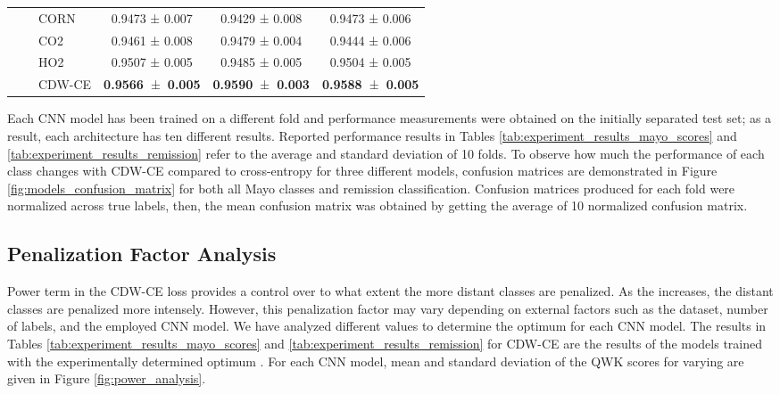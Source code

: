 \documentclass[runningheads]{llncs}
\begin{document}
\begin{table}[t!]
\begin{adjustbox}{center}
\begin{tabular}{cllccc}
                          &  & CORN                   & 0.9473 ± 0.007                   & 0.9429 ± 0.008                   & 0.9473 ± 0.006                    \\
                          &  & CO2                    & 0.9461 ± 0.008                   & 0.9479 ± 0.004                   & 0.9444 ± 0.006                    \\
                          &  & HO2                    & 0.9507 ± 0.005                   & 0.9485 ± 0.005                   & 0.9504 ± 0.005                    \\
                          &  & CDW-CE                 & \textbf{0.9566~}±\textbf{~0.005} & \textbf{0.9590~}±\textbf{~0.003} & \textbf{0.9588~}±\textbf{~0.005}  \\
\hline
\end{tabular}
\end{adjustbox}
\end{table}

Each CNN model has been trained on a different fold and performance measurements were obtained on the initially separated test set; as a result, each architecture has ten different results. Reported performance results in Tables \ref{tab:experiment_results_mayo_scores} and \ref{tab:experiment_results_remission} refer to the average and standard deviation of 10 folds. To observe how much the performance of each class changes  with CDW-CE compared to cross-entropy for three different models, confusion matrices are demonstrated in Figure \ref{fig:models_confusion_matrix} for both all Mayo classes and remission classification. Confusion matrices produced for each fold were normalized across true labels, then, the mean confusion matrix was obtained by getting the average of 10 normalized confusion matrix.

\subsection{Penalization Factor Analysis}

Power term  in the CDW-CE loss provides a control over to what extent the more distant classes are penalized. As the  increases, the distant classes are penalized more intensely. However, this penalization factor may vary depending on external factors such as the dataset, number of labels, and the employed CNN model. We have analyzed different  values to determine the optimum for each CNN model. The results in Tables \ref{tab:experiment_results_mayo_scores} and \ref{tab:experiment_results_remission} for CDW-CE are the results of the models trained with the experimentally determined optimum . For each CNN model, mean and standard deviation of the QWK scores for varying  are given in Figure \ref{fig:power_analysis}.
\end{document}
